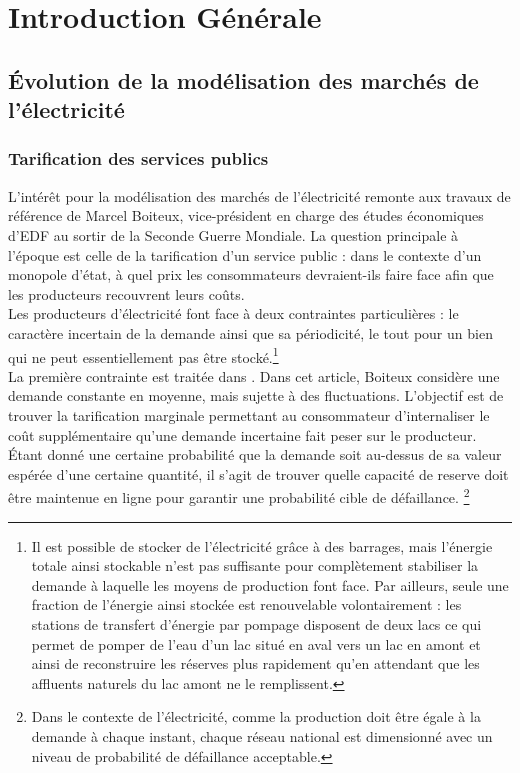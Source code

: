 \newpage
\section*{Introduction Générale}
\subsection*{Évolution de la modélisation des marchés de l'électricité}
\subsubsection*{Tarification des services publics}

L'intérêt pour la modélisation des marchés de l'électricité remonte aux travaux de référence de Marcel Boiteux, vice-président en charge des études économiques d'EDF au sortir de la Seconde Guerre Mondiale. La question principale à l'époque est celle de la tarification d'un service public : dans le contexte d'un monopole d'état, à quel prix les consommateurs devraient-ils faire face afin que les producteurs recouvrent leurs coûts. \\

Les producteurs d'électricité font face à deux contraintes particulières : le caractère incertain de la demande ainsi que sa périodicité, le tout pour un bien qui ne peut essentiellement pas être stocké.\footnote{Il est possible de stocker de l'électricité grâce à des barrages, mais l'énergie totale ainsi stockable n'est pas suffisante pour complètement stabiliser la demande à laquelle les moyens de production font face. Par ailleurs, seule une fraction de l'énergie ainsi stockée est renouvelable volontairement : les stations de transfert d'énergie par pompage disposent de deux lacs ce qui permet de pomper de l'eau d'un lac situé en aval vers un lac en amont et ainsi de reconstruire les réserves plus rapidement qu'en attendant que les affluents naturels du lac amont ne le remplissent.}\\

La première contrainte est traitée dans \cite{boiteux1951tarification}. Dans cet article, Boiteux considère une demande constante en moyenne, mais sujette à des fluctuations. L'objectif est de trouver la tarification marginale permettant au consommateur d'internaliser le coût supplémentaire qu'une demande incertaine fait peser sur le producteur. Étant donné une certaine probabilité que la demande soit au-dessus de sa valeur espérée d'une certaine quantité, il s'agit de trouver quelle capacité de reserve doit être maintenue en ligne pour garantir une probabilité cible de défaillance. \footnote{Dans le contexte de l'électricité, comme la production doit être égale à la demande à chaque instant, chaque réseau national est dimensionné avec un niveau de probabilité de défaillance acceptable. }\\

